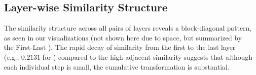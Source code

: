\subsection{Layer-wise Similarity Structure}
The similarity structure across all pairs of layers reveals a block-diagonal pattern, as seen in our visualizations (not shown here due to space, but summarized by the First-Last \cka). The rapid decay of similarity from the first to the last layer (e.g., $0.2131$ for \dscifar) compared to the high adjacent similarity suggests that although each individual step is small, the cumulative transformation is substantial.
